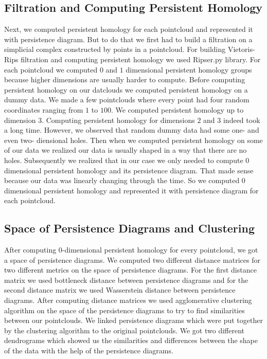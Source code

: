 \documentclass[12pt]{article}
\begin{document}
\subsection{Filtration and Computing Persistent Homology}
Next, we computed persistent homology for each pointcloud and represented it with persistence diagram. But to do that we first had to build a filtration on a simplicial complex constructed by points in a pointcloud. For building Vietoris-Rips filtration and computing persistent homology we used Ripser.py library. For each pointcloud we computed $0$ and $1$ dimensional persistent homology groups because higher dimensions are usually harder to compute. Before computing persistent homology on our datclouds we computed persistent homology on a dummy data. We made a few pointclouds where every point had four random coordinates ranging from $1$ to $100$. We computed persistent homology up to dimension $3$. Computing persistent homology for dimensions $2$ and $3$ indeed took a long time. However, we observed that random dummy data had some one- and even two- diensional holes. Then when we computed persistent homology on some of our data we realized our data is usually shaped in a way that there are no holes. Subsequently we realized that in our case we only needed to compute $0$ dimensional persistent homology and its persistence diagram. That made sense because our data was linearly changing through the time. So we computed 0 dimensional persistent homology and  represented it with persistence diagram for each pointcloud. 

\subsection{Space of Persistence Diagrams and Clustering}
After computing $0$-dimensional persistent homology for every pointcloud, we got a space of persistence diagrams. We computed two different distance matrices for two different metrics on the space of persistence diagrams. For the first distance matrix we used bottleneck distance between persistence diagrams and for the second distance matrix we used Wasserstein distance between persistence diagrams. After computing distance matrices we used agglomerative clustering algorithm on the space of the persistence diagrams to try to find similarities between our pointclouds. We linked persistence diagrams which were put together by the clustering algorithm to the original pointclouds. We got two different dendrograms which showed us the similarities and differences between the shape of the data with the help of the persistence diagrams.
\end{document}
